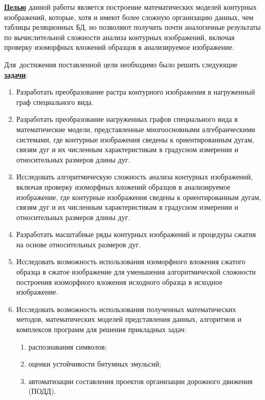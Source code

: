 \underline{\textbf{Целью}} данной работы является построение математических моделей контурных изображений, которые, хотя и имеют более сложную организацию данных, чем  таблицы реляционных БД, но позволяют получить почти аналогичные результаты по вычислительной сложности  анализа контурных изображений, включая проверку изоморфных вложений образцов в анализируемое изображение.


Для~достижения поставленной цели необходимо было решить следующие \underline{\textbf{задачи}}:
\begin{enumerate}
	\item Разработать преобразование растра контурного изображения в нагруженный граф специального вида.
	\item Разработать преобразование нагруженных графов специального вида в математические модели, представленные многоосновными алгебраическими системами, где контурные изображения сведены к ориентированным дугам, связям дуг и их численным характеристикам в градусном измерении и  относительных размеров  длины дуг.
	\item Исследовать алгоритмическую сложность  анализа контурных изображений, включая проверку изоморфных вложений образцов в анализируемое изображение, где контурные изображения сведены к ориентированным дугам, связям дуг и их численным характеристикам в градусном измерении и  относительных размеров  длины дуг.
	\item Разработать  масштабные ряды контурных изображений и процедуры сжатия на  основе относительных размеров дуг.
	\item Исследовать возможность использования  изоморфного вложения сжатого образца в сжатое изображение для уменьшения алгоритмической сложности построения  изоморфного вложения исходного образца в исходное изображение.
	\item Исследовать возможность использования полученных математических методов, математических моделей представления данных, алгоритмов и комплексов программ для решения прикладных задач:
	\begin{enumerate}
		\item распознавания символов;
		\item оценки устойчивости битумных эмульсий;
		\item автоматизации составления проектов организации дорожного движения (ПОДД). 
	\end{enumerate}
\end{enumerate}

